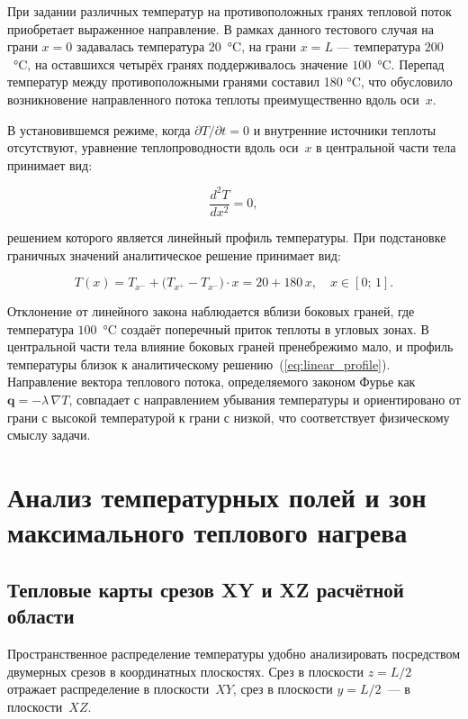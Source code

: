 При задании различных температур на противоположных
гранях тепловой поток приобретает выраженное направление.
В рамках данного тестового случая на грани $x = 0$
задавалась температура $20$~°C, на грани $x = L$ —
температура $200$~°C, на оставшихся четырёх гранях
поддерживалось значение $100$~°C. Перепад температур
между противоположными гранями составил  180 °C,
что обусловило возникновение направленного потока теплоты
преимущественно вдоль оси~$x$.

В установившемся режиме, когда $\partial T / \partial t = 0$
и внутренние источники теплоты отсутствуют, уравнение
теплопроводности вдоль оси~$x$ в центральной части
тела принимает вид:

\begin{equation}
    \frac{d^2 T}{dx^2} = 0,
    \label{eq:steady_1d}
\end{equation}

\noindent решением которого является линейный профиль температуры.
При подстановке граничных значений аналитическое решение
принимает вид:

\begin{equation}
    T(x) = T_{x^-} + \bigl(T_{x^+} - T_{x^-}\bigr)\cdot x
         = 20 + 180\,x,
    \quad x \in [0;\,1].
    \label{eq:linear_profile}
\end{equation}

Отклонение от линейного закона наблюдается вблизи боковых
граней, где температура $100$~°C создаёт поперечный приток
теплоты в угловых зонах. В центральной части тела влияние
боковых граней пренебрежимо мало, и профиль температуры
близок к аналитическому решению~(\ref{eq:linear_profile}).
Направление вектора теплового потока, определяемого
законом Фурье как $\mathbf{q} = -\lambda\,\nabla T$,
совпадает с направлением убывания температуры и ориентировано
от грани с высокой температурой к грани с низкой, что
соответствует физическому смыслу задачи.

\section{Анализ температурных полей и зон максимального теплового нагрева}

\subsection{Тепловые карты срезов XY и XZ расчётной области}

Пространственное распределение температуры удобно
анализировать посредством двумерных срезов в координатных
плоскостях. Срез в плоскости $z = L/2$ отражает
распределение в плоскости~$XY$, срез в плоскости
$y = L/2$~— в плоскости~$XZ$.

